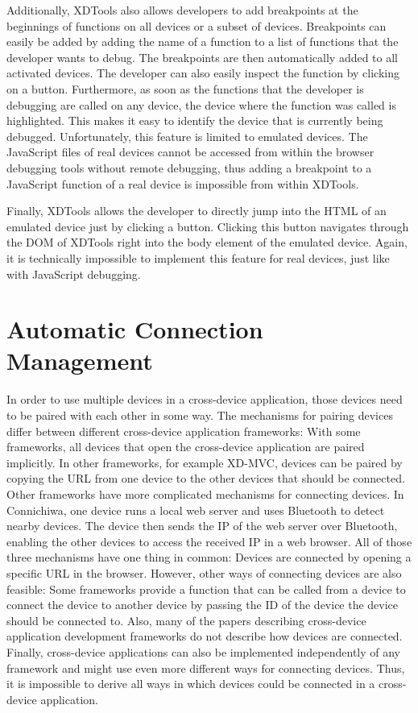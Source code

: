Additionally, XDTools also allows developers to add breakpoints at the beginnings of functions on all devices or a subset of devices. Breakpoints can easily be added by adding the name of a function to a list of functions that the developer wants to debug. The breakpoints are then automatically added to all activated devices. The developer can also easily inspect the function by clicking on a button. Furthermore, as soon as the functions that the developer is debugging are called on any device, the device where the function was called is highlighted. This makes it easy to identify the device that is currently being debugged. Unfortunately, this feature is limited to emulated devices. The JavaScript files of real devices cannot be accessed from within the browser debugging tools without remote debugging, thus adding a breakpoint to a JavaScript function of a real device is impossible from within XDTools. 

Finally, XDTools allows the developer to directly jump into the HTML of an emulated device just by clicking a button. Clicking this button navigates through the DOM of XDTools right into the body element of the emulated device. Again, it is technically impossible to implement this feature for real devices, just like with JavaScript debugging.

\section{Automatic Connection Management}

In order to use multiple devices in a cross-device application, those devices need to be paired with each other in some way. The mechanisms for pairing devices differ between different cross-device application frameworks: With some frameworks, all devices that open the cross-device application are paired implicitly. In other frameworks, for example XD-MVC, devices can be paired by copying the URL from one device to the other devices that should be connected. Other frameworks have more complicated mechanisms for connecting devices. In Connichiwa, one device runs a local web server and uses Bluetooth to detect nearby devices. The device then sends the IP of the web server over Bluetooth, enabling the other devices to access the received IP in a web browser. All of those three mechanisms have one thing in common: Devices are connected by opening a specific URL in the browser. However, other ways of connecting devices are also feasible: Some frameworks provide a function that can be called from a device to connect the device to another device by passing the ID of the device the device should be connected to. Also, many of the papers describing cross-device application development frameworks do not describe how devices are connected. Finally, cross-device applications can also be implemented independently of any framework and might use even more different ways for connecting devices. Thus, it is impossible to derive all ways in which devices could be connected in a cross-device application.

